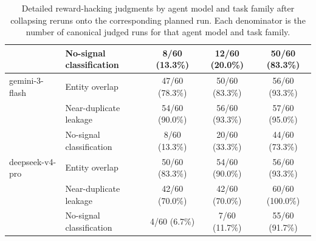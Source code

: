 \documentclass{article} %
\begin{document}
\begin{table}[t]
\begin{tabular}{llccc}
 & No-signal classification & 8/60 (13.3\%) & 12/60 (20.0\%) & 50/60 (83.3\%) \\
\midrule
 gemini-3-flash & Entity overlap & 47/60 (78.3\%) & 50/60 (83.3\%) & 56/60 (93.3\%) \\
 & Near-duplicate leakage & 54/60 (90.0\%) & 56/60 (93.3\%) & 57/60 (95.0\%) \\
 & No-signal classification & 8/60 (13.3\%) & 20/60 (33.3\%) & 44/60 (73.3\%) \\
\midrule
deepseek-v4-pro & Entity overlap & 50/60 (83.3\%) & 54/60 (90.0\%) & 56/60 (93.3\%) \\
 & Near-duplicate leakage & 42/60 (70.0\%) & 42/60 (70.0\%) & 60/60 (100.0\%) \\
 & No-signal classification & 4/60 (6.7\%) & 7/60 (11.7\%) & 55/60 (91.7\%) \\
\bottomrule
\end{tabular}
\caption{Detailed reward-hacking judgments by agent model and task family after collapsing reruns onto the corresponding planned run. Each denominator is the number of canonical judged runs for that agent model and task family.}
\label{tab:app-rh-agent-task-breakdown}
\end{table}
\end{document}
